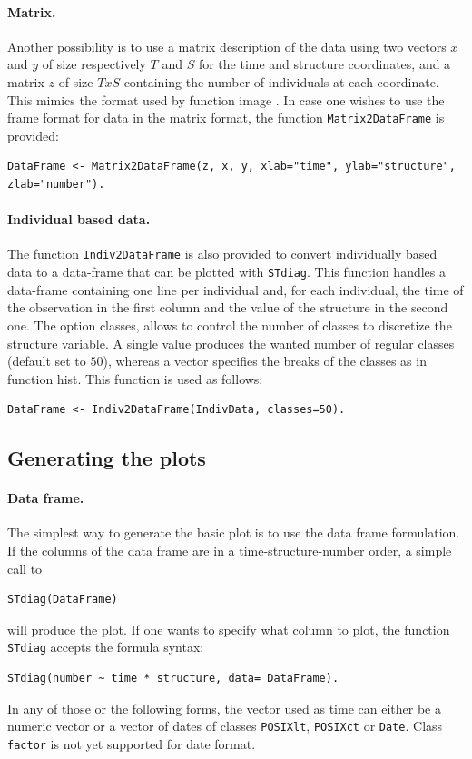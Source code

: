 \paragraph{Matrix.}
Another possibility is to use a matrix description of the data using two vectors
$x$ and $y$ of size respectively $T$ and $S$ for the time and structure
coordinates, and a matrix $z$ of size $TxS$ containing the number of individuals
at each coordinate. This mimics the format used by function image \autocite{team2012a}.
In case one wishes to use the frame format for data in the matrix format, the
function \texttt{Matrix2DataFrame} is provided:
\begin{verbatim}
DataFrame <- Matrix2DataFrame(z, x, y, xlab="time", ylab="structure",
zlab="number").
\end{verbatim}

\paragraph{Individual based data.}
The function \texttt{Indiv2DataFrame} is also provided to convert
individually based data to a data-frame that can be plotted with \texttt{STdiag}. This function handles a
data-frame containing one line per individual and, for each individual, the time
of the observation in the first column and the value of the structure in the
second one. The option classes, allows to control the number of classes to
discretize the structure variable. A single value produces the wanted number of
regular classes (default set to $50$), whereas a vector specifies the breaks of
the classes as in function hist. This function is used as follows:
\begin{verbatim}
DataFrame <- Indiv2DataFrame(IndivData, classes=50).
\end{verbatim}

\subsection{Generating the plots}

\paragraph{Data frame.}
The simplest way to generate the basic plot is to use the data frame
formulation. If the columns of the data frame are in a time-structure-number
order, a simple call to
\begin{verbatim}
STdiag(DataFrame)
\end{verbatim}
will produce the plot. If one wants to specify what column to plot, the function
\texttt{STdiag} accepts the formula syntax:
\begin{verbatim}
STdiag(number ~ time * structure, data= DataFrame).
\end{verbatim}
In any of those or the following forms, the vector used as time can either be a
numeric vector or a vector of dates of classes \texttt{POSIXlt},
\texttt{POSIXct} or \texttt{Date}. Class \texttt{factor} is not yet supported
for date format.

